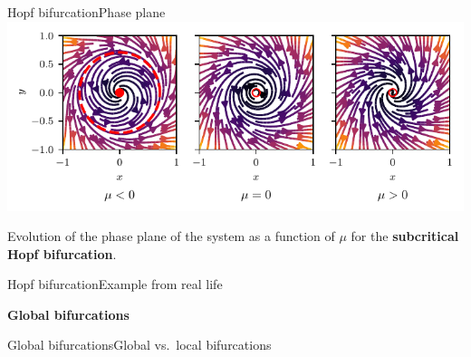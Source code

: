 \documentclass[usenames,dvipsnames,svgnames,10pt,aspectratio=169]{beamer}
\begin{document}
\begin{frame}[t, c]{Hopf bifurcation}{Phase plane}
	\centering
	\includegraphics[width=.75\textwidth]{subcritical_hopf_bifurcation_phase_plane}

	Evolution of the phase plane of the system as a function of $\mu$ for the \alert{\textbf{subcritical Hopf bifurcation}}.

	\vspace{1cm}
\end{frame}

\begin{frame}[t, c]{Hopf bifurcation}{Example from real life}

\end{frame}

\begin{frame}[t, c]{}
	\centering
	\vspace{1cm}

	{\Large \textbf{Global bifurcations}}

	\bigskip

	{}

\end{frame}

\begin{frame}[t, c]{Global bifurcations}{Global vs.\ local bifurcations}

\end{frame}
\end{document}
